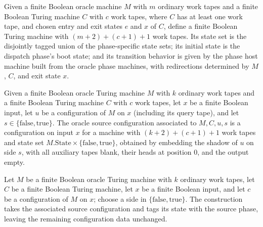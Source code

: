 \begin{definition}
\label{Turing.oracleHost}
\leanok
{}
Given a finite Boolean oracle machine $M$ with $m$ ordinary work tapes and a finite
Boolean Turing machine $C$ with $c$ work tapes, where $C$ has at least one work tape,
and chosen entry and exit states $e$ and $x$ of $C$, define a finite Boolean Turing
machine with $(m+2)+(c+1)+1$ work tapes. Its state set is the disjointly tagged union of
the phase-specific state sets; its initial state is the dispatch phase's boot state; and
its transition behavior is given by the phase host machine built from the oracle phase
machines, with redirections determined by $M$, $C$, and exit state $x$.
\end{definition}

\begin{definition}
\label{Turing.oracleSourceCfg}
\leanok
{}
Given a finite Boolean oracle Turing machine $M$ with $k$ ordinary work tapes and a
finite Boolean Turing machine $C$ with $c$ work tapes, let $x$ be a finite Boolean
input, let $u$ be a configuration of $M$ on $x$ (including its query tape), and let
$s\in\{\mathrm{false},\mathrm{true}\}$. The oracle source configuration associated to
$M,C,u,s$ is a configuration on input $x$ for a machine with $(k+2)+(c+1)+1$ work tapes
and state set $M.\mathrm{State}\times\{\mathrm{false},\mathrm{true}\}$, obtained by
embedding the shadow of $u$ on side $s$, with all auxiliary tapes blank, their heads at
position $0$, and the output empty.
\end{definition}

\begin{definition}
\label{Turing.oracleStableCfg}
\leanok
{}
Let $M$ be a finite Boolean oracle Turing machine with $k$ ordinary work tapes, let $C$
be a finite Boolean Turing machine, let $x$ be a finite Boolean input, and let $c$ be a
configuration of $M$ on $x$; choose a side in $\{\mathrm{false},\mathrm{true}\}$. The
construction takes the associated source configuration and tags its state with the
source phase, leaving the remaining configuration data unchanged.
\end{definition}

